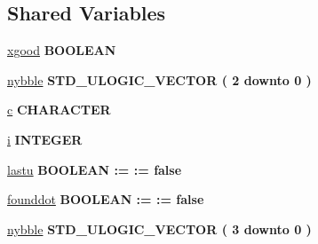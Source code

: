 \subsection*{Shared Variables}
 \begin{DoxyCompactItemize}
\item 
\hyperlink{class__fixed__pkg_a73f9cce55faa4f1d41ba7ea34d447f88}{xgood} {\bfseries \textcolor{comment}{B\+O\+O\+L\+E\+A\+N}\textcolor{vhdlchar}{ }} 
\item 
\hyperlink{class__fixed__pkg_ac6295307f17083127bb86c1099624e75}{nybble} {\bfseries \textcolor{comment}{S\+T\+D\+\_\+\+U\+L\+O\+G\+I\+C\+\_\+\+V\+E\+C\+T\+O\+R}\textcolor{vhdlchar}{ }\textcolor{vhdlchar}{(}\textcolor{vhdlchar}{ }\textcolor{vhdlchar}{ } \textcolor{vhdldigit}{2} \textcolor{vhdlchar}{ }\textcolor{keywordflow}{downto}\textcolor{vhdlchar}{ }\textcolor{vhdlchar}{ } \textcolor{vhdldigit}{0} \textcolor{vhdlchar}{ }\textcolor{vhdlchar}{)}\textcolor{vhdlchar}{ }} 
\item 
\hyperlink{class__fixed__pkg_a5d09b73b2e53a1420261a99b8362bfb7}{c} {\bfseries \textcolor{comment}{C\+H\+A\+R\+A\+C\+T\+E\+R}\textcolor{vhdlchar}{ }} 
\item 
\hyperlink{class__fixed__pkg_ae68b22484ddb5973bbd6638fb8aa36f7}{i} {\bfseries \textcolor{comment}{I\+N\+T\+E\+G\+E\+R}\textcolor{vhdlchar}{ }} 
\item 
\hyperlink{class__fixed__pkg_a13bfea3db42214b0906e3efa96772004}{lastu} {\bfseries \textcolor{comment}{B\+O\+O\+L\+E\+A\+N}\textcolor{vhdlchar}{ }\textcolor{vhdlchar}{ }\textcolor{vhdlchar}{\+:}\textcolor{vhdlchar}{=}\textcolor{vhdlchar}{ }\textcolor{vhdlchar}{\+:}\textcolor{vhdlchar}{=}\textcolor{vhdlchar}{ }\textcolor{vhdlchar}{ }\textcolor{vhdlchar}{ }\textcolor{vhdlchar}{ }\textcolor{vhdlchar}{false}\textcolor{vhdlchar}{ }} 
\item 
\hyperlink{class__fixed__pkg_a3337237e7fa6ef72f361432a63bb1ef2}{founddot} {\bfseries \textcolor{comment}{B\+O\+O\+L\+E\+A\+N}\textcolor{vhdlchar}{ }\textcolor{vhdlchar}{ }\textcolor{vhdlchar}{\+:}\textcolor{vhdlchar}{=}\textcolor{vhdlchar}{ }\textcolor{vhdlchar}{\+:}\textcolor{vhdlchar}{=}\textcolor{vhdlchar}{ }\textcolor{vhdlchar}{ }\textcolor{vhdlchar}{ }\textcolor{vhdlchar}{ }\textcolor{vhdlchar}{false}\textcolor{vhdlchar}{ }} 
\item 
\hyperlink{class__fixed__pkg_a5d906e8ada3696b5c64dada4896947dc}{nybble} {\bfseries \textcolor{comment}{S\+T\+D\+\_\+\+U\+L\+O\+G\+I\+C\+\_\+\+V\+E\+C\+T\+O\+R}\textcolor{vhdlchar}{ }\textcolor{vhdlchar}{(}\textcolor{vhdlchar}{ }\textcolor{vhdlchar}{ } \textcolor{vhdldigit}{3} \textcolor{vhdlchar}{ }\textcolor{keywordflow}{downto}\textcolor{vhdlchar}{ }\textcolor{vhdlchar}{ } \textcolor{vhdldigit}{0} \textcolor{vhdlchar}{ }\textcolor{vhdlchar}{)}\textcolor{vhdlchar}{ }} 
\end{DoxyCompactItemize}


